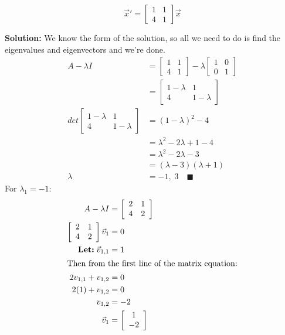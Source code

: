 \documentclass[letterpaper, fontsize=11pt]{scrartcl} %
\numberwithin{equation}{section} %
\numberwithin{figure}{section} %
\numberwithin{table}{section} %
\begin{document}
\begin{enumerate}
\[
\vec x' = \left[ \begin{array}{cc} 1 & 1 \\ 4 &1 \end{array} \right] \vec x
\]
\par \textbf{Solution:} We know the form of the solution, so all we need to do is find the eigenvalues and eigenvectors and we're done.
\begin{align*}
A - \lambda I &= \left[ \begin{array}{cc} 1 & 1 \\ 4 &1 \end{array} \right] - \lambda \left[ \begin{array}{cc}1 & 0 \\ 0 &1 \end{array} \right] \\
&= \left[ \begin{array}{cc} 1-\lambda & 1 \\ 4 &1-\lambda \end{array} \right] \\
det\left[ \begin{array}{cc} 1-\lambda & 1 \\ 4 &1-\lambda \end{array} \right] &= (1-\lambda)^2 - 4\\
&= \lambda^2 - 2\lambda + 1 - 4\\
&= \lambda^2 -2 \lambda -3\\
&= (\lambda-3)(\lambda +1)\\
\lambda &= -1,\; 3\quad\blacksquare
\end{align*}
For $\lambda_1 = -1$:
\begin{align*}
A - \lambda I &= \left[ \begin{array}{cc} 2 & 1 \\ 4 &2 \end{array} \right]\\
\left[ \begin{array}{cc} 2 & 1 \\ 4 &2 \end{array} \right] \vec v_1&= 0\\
\textbf{Let:} \; \vec v_{1,1} &= 1\\
\intertext{Then from the first line of the matrix equation:}
2v_{1,1} + v_{1,2} &= 0\\
2(1) + v_{1,2} &= 0\\
v_{1,2} &= -2\\
\vec v_1 &= \left[ \begin{array}{c} 1\\ -2 \end{array} \right]
\end{align*}


\end{enumerate}
\end{document}
